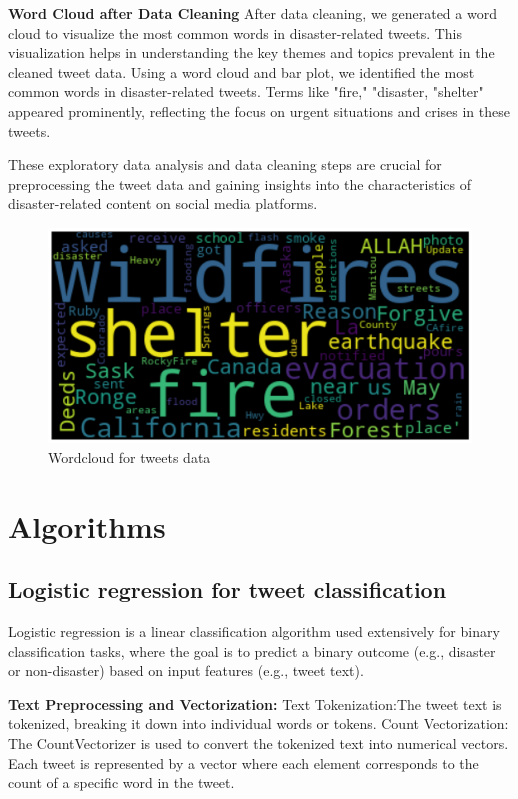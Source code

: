 \newpage
\textbf{Word Cloud after Data Cleaning}
After data cleaning, we generated a word cloud to visualize the most common words in disaster-related tweets. This visualization helps in understanding the key themes and topics prevalent in the cleaned tweet data. Using a word cloud and bar plot, we identified the most common words in disaster-related tweets. Terms like "fire," "disaster, "shelter" appeared prominently, reflecting the focus on urgent situations and crises in these tweets.

These exploratory data analysis and data cleaning steps are crucial for preprocessing the tweet data and gaining insights into the characteristics of disaster-related content on social media platforms.
\begin{figure}[ht]
    \centering
    \includegraphics[scale=0.5]{figures/wordcloud.png}
    \caption{Wordcloud for tweets data}
\end{figure}

\newpage
\section{Algorithms}


\subsection{Logistic regression for tweet classification}
Logistic regression is a linear classification algorithm used extensively for binary classification tasks, where the goal is to predict a binary outcome (e.g., disaster or non-disaster) based on input features (e.g., tweet text).

\textbf{Text Preprocessing and Vectorization:}
Text Tokenization:The tweet text is tokenized, breaking it down into individual words or tokens. Count Vectorization: The CountVectorizer is used to convert the tokenized text into numerical vectors. Each tweet is represented by a vector where each element corresponds to the count of a specific word in the tweet.


